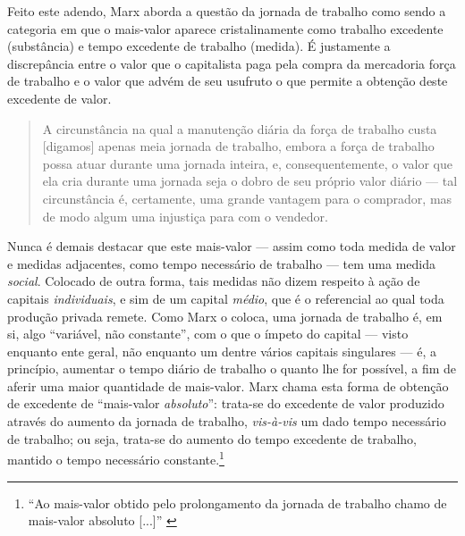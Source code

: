 Feito este adendo, Marx aborda a questão da jornada de trabalho como sendo a categoria em que o mais-valor aparece cristalinamente como trabalho excedente (substância) e tempo excedente de trabalho (medida). É justamente a discrepância entre o valor que o capitalista paga pela compra da mercadoria força de trabalho e o valor que advém de seu usufruto o que permite a obtenção deste excedente de valor.
\begin{quote}
    A circunstância na qual a manutenção diária da força de trabalho custa [digamos] apenas meia jornada de trabalho, embora a força de trabalho possa atuar durante uma jornada inteira, e, consequentemente, o valor que ela cria durante uma jornada seja o dobro de seu próprio valor diário --- tal circunstância é, certamente, uma grande vantagem para o comprador, mas de modo algum uma injustiça para com o vendedor. \parencite[p. 270]{Marx2017}
\end{quote}

Nunca é demais destacar que este mais-valor --- assim como toda medida de valor e medidas adjacentes, como tempo necessário de trabalho --- tem uma medida \textit{social}. Colocado de outra forma, tais medidas não dizem respeito à ação de capitais \textit{individuais}, e sim de um capital \textit{médio}, que é o referencial ao qual toda produção privada remete. Como Marx o coloca, uma jornada de trabalho é, em si, algo ``variável, não constante'', com o que o ímpeto do capital --- visto enquanto ente geral, não enquanto um dentre vários capitais singulares --- é, a princípio, aumentar o tempo diário de trabalho o quanto lhe for possível, a fim de aferir uma maior quantidade de mais-valor. Marx chama esta forma de obtenção de excedente de ``mais-valor \textit{absoluto}'': trata-se do excedente de valor produzido através do aumento da jornada de trabalho, \textit{vis-à-vis} um dado tempo necessário de trabalho; ou seja, trata-se do aumento do tempo excedente de trabalho, mantido o tempo necessário constante.\footnote{``Ao mais-valor obtido pelo prolongamento da jornada de trabalho chamo de mais-valor absoluto [...]'' \parencite[p. 390]{Marx2017}} %


